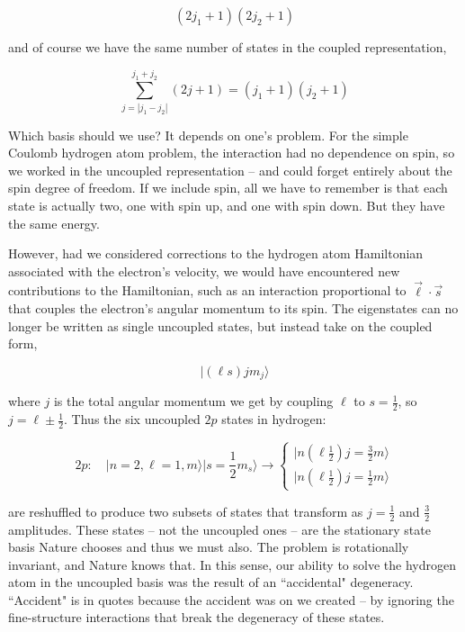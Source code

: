 \[
  (2j_1 + 1 )(2j_2+1)
\] \vspace{3px}

and of course we have the same number of states in the coupled representation, 

\[
\sum_{j=|j_1 - j_2|}^{j_1+j_2} (2j+1) = (j_1 + 1)(j_2+1) 
\] \vspace{3px}


Which basis should we use? It depends on one's problem. For the simple Coulomb
hydrogen atom problem, the interaction had no dependence on spin, so we worked
in the uncoupled representation -- and could forget entirely about the spin
degree of freedom. If we include spin, all we have to remember is that each
state is actually two, one with spin up, and one with spin down. But they have
the same energy. 

However, had we considered corrections to the hydrogen atom Hamiltonian
associated with the electron's velocity, we would have encountered new
contributions to the Hamiltonian, such as an interaction proportional to
$\vec{\ell} \cdot \vec{s} $ that couples the electron's angular momentum to its
spin. The eigenstates can no longer be written as single uncoupled states, but
instead take on the coupled form, 

\[
|(\ell s) jm_j\rangle
\] \vspace{3px}


where $j$ is the total angular momentum we get by coupling $\ell$ to $s
= \frac{1}{2}$, so $j = \ell \pm \frac{1}{2}$. Thus the six uncoupled $2p$
states in hydrogen: 

\[
2p: \quad |n=2, \ell=1, m \rangle |s = \frac{1}{2}m_s\rangle \rightarrow
\begin{cases}
  |n \left( \ell\frac{1}{2} \right) j = \frac{3}{2} m\rangle \\ 
  |n\left( \ell\frac{1}{2} \right) j = \frac{1}{2}m\rangle 
\end{cases} 
\] \vspace{3px}




are reshuffled to produce two subsets of states that transform as $j
= \frac{1}{2}$ and $\frac{3}{2}$ amplitudes. These states -- not the uncoupled
ones -- are the stationary state basis Nature chooses and thus we must also.
The problem is rotationally invariant, and Nature knows that. In this sense,
our ability to solve the hydrogen atom in the uncoupled basis was the result of
an ``accidental" degeneracy. ``Accident" is in quotes because the accident was
on we created -- by ignoring the fine-structure interactions that break the
degeneracy of these states.


